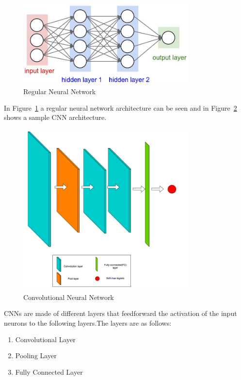 \begin{figure}[t]
\caption{Regular Neural Network}
\label{figregnn}
\centering
\includegraphics[width=0.8\textwidth]{Figures/regnn}
\end{figure}

In Figure~\ref{figregnn} a regular neural network architecture can be seen and in Figure~\ref{figconvnet} shows a sample CNN architecture. 

\begin{figure}[t]
\caption{Convolutional Neural Network}
\label{figconvnet}
\centering
\includegraphics[width=0.8\textwidth]{Figures/convnet}
\end{figure}

CNNs are made of different layers that feedforward the activation of the input neurons to the following layers.The layers are as follows:

\begin{enumerate}
    \item Convolutional Layer
    \item Pooling Layer
    \item Fully Connected Layer
\end{enumerate}

